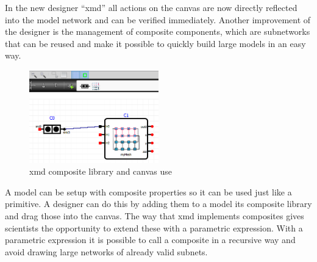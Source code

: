 In the new designer ``xmd'' all actions on the canvas are now directly reflected
into the model network and can be verified immediately. Another improvement of
the designer is the management of composite components, which are subnetworks
that can be reused and make it possible to quickly build large models in an easy
way.
\begin{figure}
  \vspace{-20pt}
  \begin{center}
    \includegraphics[width=0.50\textwidth]{composite-use}
  \end{center}
  \vspace{-20pt}
  \caption{xmd composite library and canvas use}
\label{fig:composite-use}
  \vspace{-10pt}
\end{figure}
A model can be setup with composite properties so it can be used just
like a primitive. A designer can do this by adding them to a model its composite
library and drag those into the canvas. The way that xmd implements composites
gives scientists the opportunity to extend these with a parametric expression.
With a parametric expression it is possible to call a composite in a recursive
way and avoid drawing large networks of already valid subnets.

\newpage